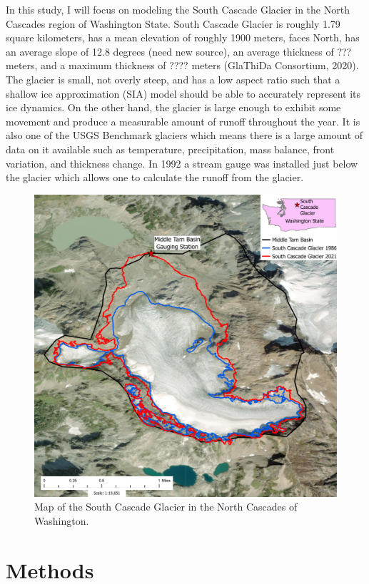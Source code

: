 \documentclass{article}
\begin{document}
In this study, I will focus on modeling the South Cascade Glacier in the North Cascades region of Washington State. South Cascade Glacier is 
roughly 1.79 square kilometers, has a mean elevation of roughly 1900 meters, faces North, has an average slope of 12.8 degrees (need new 
source), an average thickness of ??? meters, and a maximum thickness of ???? meters (GlaThiDa Consortium, 2020). The glacier is small, not 
overly steep, and has a low aspect ratio such that a shallow ice approximation (SIA) model should be able to accurately represent its ice 
dynamics. On the other hand, the glacier is large enough to exhibit some movement and produce a measurable amount of runoff throughout the 
year. It is also one of the USGS Benchmark glaciers which means there is a large amount of data on it available such as temperature, 
precipitation, mass balance, front variation, and thickness change. In 1992 a stream gauge was installed just below the glacier which allows 
one to calculate the runoff from the glacier. 
\begin{figure}[h!]
    \centering
    \includegraphics[width=\textwidth]{Plots/SouthCascadeGlacierMap.pdf}
    \caption{Map of the South Cascade Glacier in the North Cascades of Washington.}
    \label{fig:south_cascade_glacier}
\end{figure}
\FloatBarrier
\section{Methods}
\end{document}
